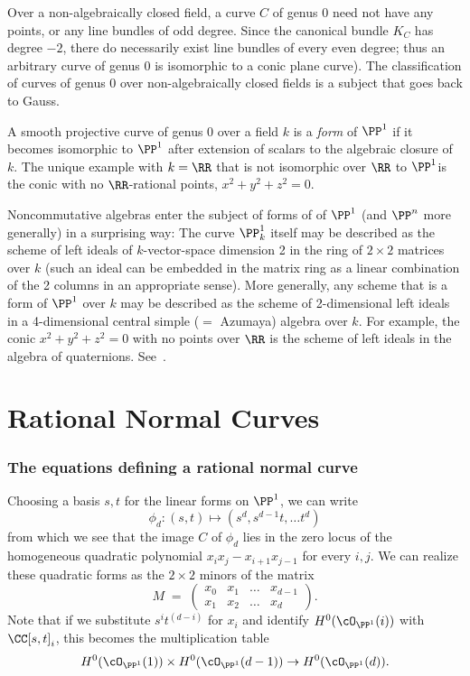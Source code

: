 \begin{fact}
Over a non-algebraically closed field, a curve $C$ of genus 0 need not have any points, or any line bundles of odd degree. Since the canonical bundle $K_C$ has degree $-2$, there do necessarily exist line bundles of every even degree; thus an arbitrary curve of genus 0 is isomorphic to a conic plane curve). 
The classification of curves of genus 0 over non-algebraically closed fields is a subject that goes back to Gauss.

A smooth projective curve of genus 0 over a field $k$ is a \emph{form} of $\PP^1$ if it becomes isomorphic to $\PP^1$ after extension
of scalars to
the algebraic closure of $k$. The unique example with $k = \RR$ that is not isomorphic over $\RR$ to $\PP^1$is the conic with no $\RR$-rational points, $x^2+y^2+z^2 = 0$. 

Noncommutative algebras enter the subject of forms of of $\PP^1$ (and $\PP^n$ more generally) in a surprising way: The curve $\PP_k^1$ itself may be described as the scheme of left ideals of $k$-vector-space dimension 2 in the ring of
$2\times 2$ matrices over $k$ (such an ideal can be embedded in the matrix ring as a linear combination of the 2 columns in an appropriate sense). More generally, any scheme that is a form of $\PP^1$ over $k$
may be described as the scheme of 2-dimensional left ideals in a 4-dimensional central simple ($=$ Azumaya) algebra over $k$. For example, the
conic $x^2+y^2+z^2 = 0$ with no points over $\RR$ is the scheme of left ideals in the algebra of quaternions. See~\cite[Section X.6]{Serre1979}.
\end{fact}

\section{Rational Normal Curves}\label{rational normal curves section}


\subsubsection{The equations defining a rational normal curve}

Choosing a basis $s,t$ for the linear forms on $\PP^1$, we can write
$$
\phi_d : (s,t) \mapsto (s^d, s^{d-1}t,\dots t^d)
$$
from which we see that the image $C$ of $\phi_d$ lies in the zero locus of the homogeneous quadratic polynomial $x_i x_j - x_{i+1}x_{j-1}$ for every $i,j$. We can realize these quadratic forms as the $2\times 2$ minors of the matrix
$$
M \; = \; \begin{pmatrix}
x_0 & x_1 & \dots & x_{d-1} \\
x_1 & x_2 & \dots & x_d
\end{pmatrix}.
$$
Note that if we substitute $s^it^{(d-i)}$ for $x_i$ and identify $H^0(\cO_{\PP^1}(i))$ with $\CC[s,t]_i$, this becomes the multiplication table
$$
H^0(\cO_{\PP^1}(1)) \times H^0(\cO_{\PP^1}(d-1)) \to H^0(\cO_{\PP^1}(d)).
$$

